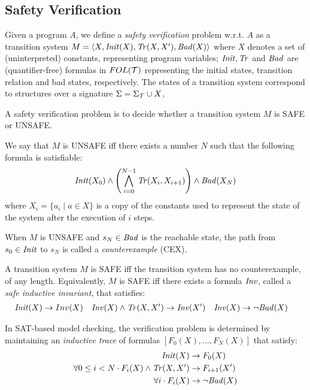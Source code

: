 


\subsection{Safety Verification}
Given a program $A$, we define a \emph{safety verification} problem w.r.t. $A$ as a transition system $M=\langle X, \mathit{Init}(X),\mathit{Tr}(X,X'),\mathit{Bad}(X)\rangle$ where $X$ denotes a set of (uninterpreted) constants, representing program variables; $\mathit{Init}, \mathit{Tr}$ and $\mathit{Bad}$ are (quantifier-free) formulas in $FOL(\mathcal{T})$ representing the initial states, transition relation and bad states, respectively. The states of a transition system correspond to structures over a signature $\Sigma = \Sigma_{\mathcal{T}} \cup X$, 

A safety verification problem is to decide whether a transition
system $M$ is SAFE or UNSAFE.

We say that $M$ is UNSAFE iff there exists a
number $N$ such that the following formula is satisfiable:
\begin{equation}
  \mathit{Init}(X_0) \land \left( \bigwedge_{i=0}^{N-1} \mathit{Tr}(X_i, X_{i+1}) \right)
  \land \mathit{Bad}(X_N)
\end{equation}
where $X_i = \{a_i \mid a \in X\}$ is a copy of the constants used to represent the state of the system after the execution of $i$ steps.

When $M$ is UNSAFE and $s_N\in\mathit{Bad}$ is the reachable state, the path from $s_0\in\mathit{Init}$ to $s_N$ is called a \emph{counterexample} (CEX).

A transition system $M$ is SAFE iff the transition system has no counterexample, of any length. Equivalently, $M$ is SAFE iff there exists a formula $\mathit{Inv}$, called a
\emph{safe inductive invariant}, that satisfies:
\begin{align}
  \mathit{Init}(X) &\to Inv(X) & \mathit{Inv}(X) \land \mathit{Tr}(X,X') &\to \mathit{Inv}(X') & \mathit{Inv}(X) &\to \neg \mathit{Bad}(X)
\end{align}

In SAT-based model checking, the verification problem is determined by maintaining an \emph{inductive trace} of formulas $[F_0(X), \ldots, F_N(X)]$ that satisfy:
\begin{align}
  \mathit{Init}(X) &\to F_0(X)  \\
  \forall 0 \leq i < N \cdot F_i(X) \land \mathit{Tr}(X,X') &\to F_{i+1}(X') \\
  \forall i \cdot F_i(X) &\to \neg \mathit{Bad}(X)
\end{align}

